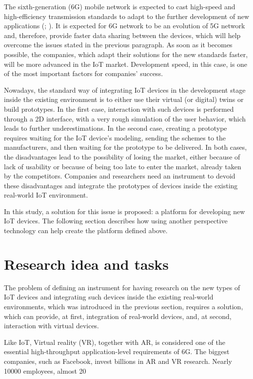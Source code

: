 The sixth-generation (6G) mobile network is expected to cast high-speed and high-efficiency transmission standards to adapt to the further development of new applications (\cite{liao_information-centric_2021}; \cite{huang_survey_2019}). It is expected for 6G network to be an evolution of 5G network and, therefore, provide faster data sharing between the devices, which will help overcome the issues stated in the previous paragraph. As soon as it becomes possible, the companies, which adapt their solutions for the new standards faster, will be more advanced in the IoT market. Development speed, in this case, is one of the most important factors for companies' success.

Nowadays, the standard way of integrating IoT devices in the development stage inside the existing environment is to either use their virtual (or digital) twins or build prototypes. In the first case, interaction with such devices is performed through a 2D interface, with a very rough simulation of the user behavior, which leads to further underestimations. In the second case, creating a prototype requires waiting for the IoT device's modeling, sending the schemes to the manufacturers, and then waiting for the prototype to be delivered. In both cases, the disadvantages lead to the possibility of losing the market, either because of lack of usability or because of being too late to enter the market, already taken by the competitors. Companies and researchers need an instrument to devoid these disadvantages and integrate the prototypes of devices inside the existing real-world IoT environment.

In this study, a solution for this issue is proposed: a platform for developing new IoT devices. The following section describes how using another perspective technology can help create the platform defined above.

\section{Research idea and tasks}

The problem of defining an instrument for having research on the new types of IoT devices and integrating such devices inside the existing real-world environments, which was introduced in the previous section, requires a solution, which can provide, at first, integration of real-world devices, and, at second, interaction with virtual devices.

Like IoT, Virtual reality (VR), together with AR, is considered one of the essential high-throughput application-level requirements of 6G. The biggest companies, such as Facebook, invest billions in AR and VR research. Nearly 10000 employees, almost 20%

